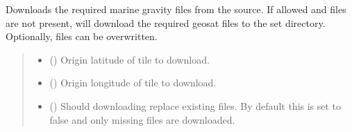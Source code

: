 \documentclass[letterpaper,10pt,english]{sphinxmanual}
\begin{document}
\begin{fulllineitems}
\begin{fulllineitems}
\label{\detokenize{modules/gravity/ggm_plus:qnav.gravity.ggm_plus.GGMPlusAcc.download_data}}
\pysigstartsignatures
{}
\pysigstopsignatures
\sphinxAtStartPar
Downloads the required marine gravity files from the source.
If allowed and files are not present, will download the required
geosat files to the set directory. Optionally, files can be
overwritten.
\begin{quote}\begin{description}
\begin{itemize}
\item {} 
\sphinxAtStartPar
{} () \textendash{} Origin latitude of tile to download.

\item {} 
\sphinxAtStartPar
{} () \textendash{} Origin longitude of tile to download.

\item {} 
\sphinxAtStartPar
{} () \textendash{} Should downloading replace existing files.
By default this is set to false and only missing files
are downloaded.

\end{itemize}

\end{description}\end{quote}

\end{fulllineitems}


\end{fulllineitems}

\end{document}
